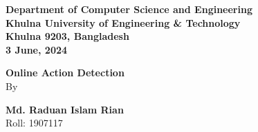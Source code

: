 \documentclass[12pt]{article}
\begin{document}
\begin{titlepage}
\begin{center}
    \vspace{12pt}
    \vspace{12pt}
    \vspace{12pt}
    \vspace{12pt}
    \vspace{12pt}
    \vspace{12pt}
    \vspace{12pt}
    \vspace{12pt}
    \vspace{12pt}
    \vspace{12pt}
    {\fontsize{12}{1.5}\selectfont \textbf{Department of Computer Science and Engineering}}\\
    \vspace{12pt}
    {\fontsize{12}{1.5}\selectfont \textbf{Khulna University of Engineering \& Technology}}\\
    \vspace{12pt}
    {\fontsize{12}{1.5}\selectfont \textbf{Khulna 9203, Bangladesh}}\\
    \vspace{12pt}
    {\fontsize{12}{1.5}\selectfont \textbf{3 June, 2024}}\\

    \vspace{12pt}
    
    {\fontsize{18}{1.5}\selectfont \textbf{Online Action Detection}}\\
    \vspace{12pt}
    \vspace{12pt}
    \vspace{12pt}
    {\fontsize{12}{1.5}\selectfont By}\\
    \vspace{12pt}
    \vspace{12pt}
    {\fontsize{12}{1.5}\selectfont \textbf{Md. Raduan Islam Rian}\\
    \vspace{12pt}
    {\fontsize{12}{1.5}\selectfont Roll: 1907117}\\
    \vspace{12pt}
    \vspace{12pt}
    \vspace{12pt}
    \vspace{12pt}
    \vspace{12pt}
    
}
\end{center}
\end{titlepage}
\end{document}
